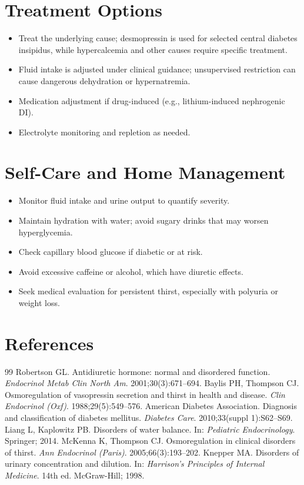 \section*{Treatment Options}
\begin{itemize}
  \item Treat the underlying cause; desmopressin is used for selected central diabetes insipidus, while hypercalcemia and other causes require specific treatment.
  \item Fluid intake is adjusted under clinical guidance; unsupervised restriction can cause dangerous dehydration or hypernatremia.
  \item Medication adjustment if drug-induced (e.g., lithium-induced nephrogenic DI).
  \item Electrolyte monitoring and repletion as needed.
\end{itemize}


\section*{Self-Care and Home Management}
\begin{itemize}
  \item Monitor fluid intake and urine output to quantify severity.
  \item Maintain hydration with water; avoid sugary drinks that may worsen hyperglycemia.
  \item Check capillary blood glucose if diabetic or at risk.
  \item Avoid excessive caffeine or alcohol, which have diuretic effects.
  \item Seek medical evaluation for persistent thirst, especially with polyuria or weight loss.
\end{itemize}

\section*{References}
\begin{thebibliography}{99}
Robertson GL. Antidiuretic hormone: normal and disordered function. \textit{Endocrinol Metab Clin North Am}. 2001;30(3):671--694.
Baylis PH, Thompson CJ. Osmoregulation of vasopressin secretion and thirst in health and disease. \textit{Clin Endocrinol (Oxf)}. 1988;29(5):549--576.
American Diabetes Association. Diagnosis and classification of diabetes mellitus. \textit{Diabetes Care}. 2010;33(suppl 1):S62--S69.
Liang L, Kaplowitz PB. Disorders of water balance. In: \textit{Pediatric Endocrinology}. Springer; 2014.
McKenna K, Thompson CJ. Osmoregulation in clinical disorders of thirst. \textit{Ann Endocrinol (Paris)}. 2005;66(3):193--202.
Knepper MA. Disorders of urinary concentration and dilution. In: \textit{Harrison's Principles of Internal Medicine}. 14th ed. McGraw-Hill; 1998.
\end{thebibliography}
